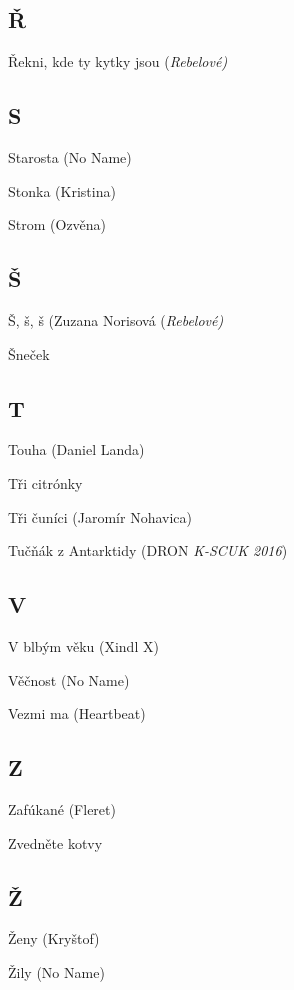 \begin{multicols}{2}
\subsection*{Ř}
Řekni, kde ty kytky jsou (\emph{Rebelové)}

\subsection*{S}
Starosta (No Name)

Stonka (Kristina)

Strom (Ozvěna)

\subsection*{Š}
Š, š, š (Zuzana Norisová (\emph{Rebelové)}

Šneček

\subsection*{T}
Touha (Daniel Landa)

Tři citrónky

Tři čuníci (Jaromír Nohavica)

Tučňák z Antarktidy (DRON \emph{K-SCUK 2016})

\subsection*{V}
V blbým věku (Xindl X)

Věčnost (No Name)

Vezmi ma (Heartbeat)

\subsection*{Z}
Zafúkané (Fleret)

Zvedněte kotvy

\subsection*{Ž}
Ženy (Kryštof)

Žily (No Name)

\end{multicols}

\newpage
